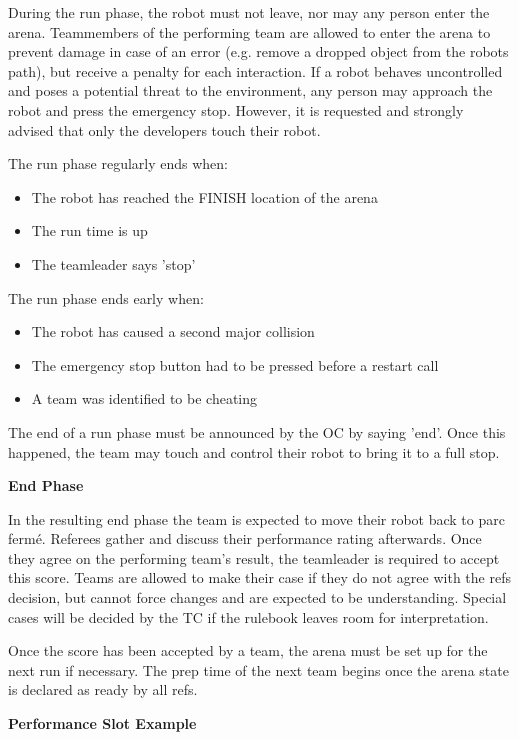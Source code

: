 During the run phase, the robot must not leave, nor may any person enter the arena.
Teammembers of the performing team are allowed to enter the arena to prevent damage in case of an error (e.g. remove a dropped object from the robots path), but receive a penalty for each interaction.
If a robot behaves uncontrolled and poses a potential threat to the environment,
any person may approach the robot and press the emergency stop.
However, it is requested and strongly advised that only the developers touch their robot.


The run phase regularly ends when:
\begin{itemize}
\item The robot has reached the FINISH location of the arena
\item The run time is up
\item The teamleader says 'stop'
\end{itemize}

The run phase ends early when:
\begin{itemize}
\item The robot has caused a second major collision
\item The emergency stop button had to be pressed before a restart call
\item A team was identified to be cheating 
\end{itemize}

The end of a run phase must be announced by the OC by saying 'end'.
Once this happened, the team may touch and control their robot to bring it to a full stop.

\textbf{End Phase}

In the resulting end phase the team is expected to move their robot back to parc ferm\'e.
Referees gather and discuss their performance rating afterwards.
Once they agree on the performing team's result, 
the teamleader is required to accept this score. 
Teams are allowed to make their case if they do not agree with the refs decision,
but cannot force changes and are expected to be understanding.
Special cases will be decided by the TC if the rulebook leaves room for interpretation.

Once the score has been accepted by a team,
the arena must be set up for the next run if necessary.
The prep time of the next team begins once the arena state is declared as ready by all refs.


\textbf{Performance Slot Example}

